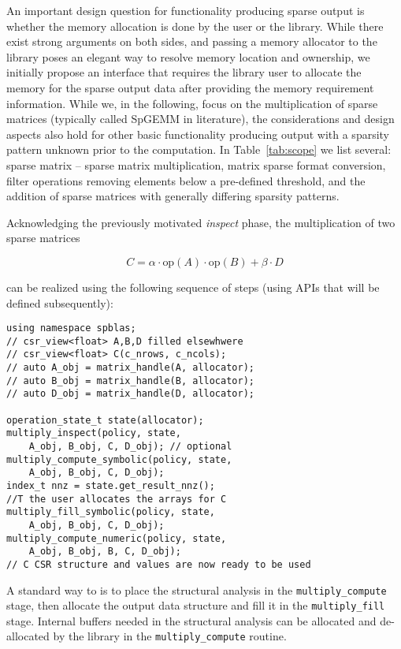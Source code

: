 \documentclass{article}
\newcommand{\fb}[1]{\todo[color=green!30]{\footnotesize #1}}
\begin{document}
An important design question for functionality producing sparse output is whether the memory allocation is done by the user or the library. While there exist strong arguments on both sides, and passing a memory allocator to the library poses an elegant way to resolve memory location and ownership, we initially propose an interface that requires the library user to allocate the memory for the sparse output data after providing the memory requirement information. While we, in the following, focus on the multiplication of sparse matrices (typically called SpGEMM in literature), the considerations and design aspects also hold for other basic functionality producing output with a sparsity pattern unknown prior to the computation. In Table~\ref{tab:scope} we list several: sparse matrix -- sparse matrix multiplication, matrix sparse format conversion, filter operations removing elements below a pre-defined threshold, and the addition of sparse matrices with generally differing sparsity patterns.
 
Acknowledging the previously motivated \textit{inspect} phase, the multiplication of two sparse matrices 

\begin{equation*}
C = \alpha \cdot \text{op}(A) \cdot \text{op}(B) + \beta \cdot D
\end{equation*}

can be realized using the following sequence of steps (using APIs that will be defined subsequently):
\begin{verbatim}
using namespace spblas;
// csr_view<float> A,B,D filled elsewhwere
// csr_view<float> C(c_nrows, c_ncols);
// auto A_obj = matrix_handle(A, allocator);
// auto B_obj = matrix_handle(B, allocator);
// auto D_obj = matrix_handle(D, allocator);

operation_state_t state(allocator);
multiply_inspect(policy, state, 
    A_obj, B_obj, C, D_obj); // optional
multiply_compute_symbolic(policy, state, 
    A_obj, B_obj, C, D_obj);
index_t nnz = state.get_result_nnz();
//T the user allocates the arrays for C
multiply_fill_symbolic(policy, state, 
    A_obj, B_obj, C, D_obj);
multiply_compute_numeric(policy, state, 
    A_obj, B_obj, B, C, D_obj);
// C CSR structure and values are now ready to be used
\end{verbatim}

A standard way to is to place the structural analysis in the \texttt{multiply\_compute} stage, then allocate the output data structure and fill it in the \texttt{multiply\_fill} stage. Internal buffers needed in the structural analysis can be allocated and de-allocated by the library in the \texttt{multiply\_compute} routine. 
\end{document}
